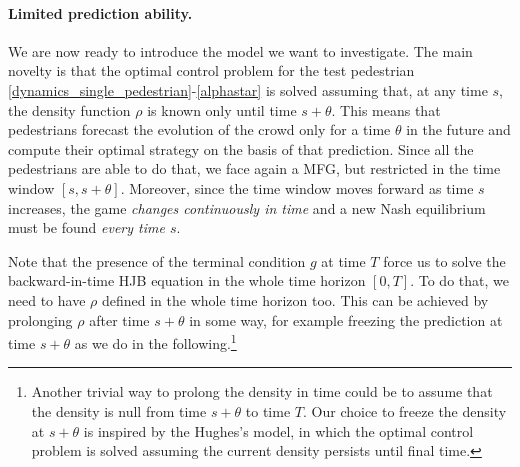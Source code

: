 \documentclass{cmslatex}
\renewcommand{\r}{\rho}
\begin{document}
\paragraph{Limited prediction ability.}
We are now ready to introduce the model we want to investigate. 
The main novelty is that the optimal control problem for the test pedestrian \eqref{dynamics_single_pedestrian}-\eqref{alphastar} is solved assuming that, at any time $s$, the density function $\r$ is known only until time $s+\theta$.
This means that pedestrians forecast the evolution of the crowd only for a time $\theta$ in the future and compute their optimal strategy on the basis of that prediction.
Since all the pedestrians are able to do that, we face again a MFG, but restricted in the time window $[s,s+\theta]$. 
Moreover, since the time window moves forward as time $s$ increases, the game \textit{changes continuously in time} and a new Nash equilibrium must be found \emph{every time $s$}.

Note that the presence of the terminal condition $g$ at time $T$ force us to solve the backward-in-time HJB equation in the whole time horizon $[0,T]$. 
To do that, we need to have $\r$ defined in the whole time horizon too. This can be achieved by prolonging $\r$ after time $s+\theta$ in some way, for example freezing the prediction at time $s+\theta$ as we do in the following.\footnote{Another trivial way to prolong the density in time could be to assume that the density is null from time $s+\theta$ to time $T$. Our choice to freeze the density at $s+\theta$ is inspired by the Hughes's model, in which the optimal control problem is solved assuming the current density persists until final time.}
\end{document}
